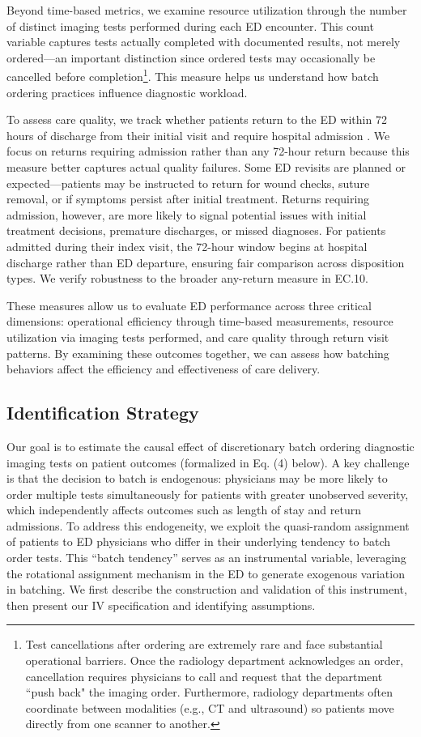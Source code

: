\documentclass[,,blindrev]{informs}
\begin{document}
Beyond time-based metrics, we examine resource utilization through the
number of distinct imaging tests performed during each ED encounter.
This count variable captures tests actually completed with documented
results, not merely ordered---an important distinction since ordered
tests may occasionally be cancelled before
completion\footnote{Test cancellations after ordering are extremely rare and face substantial operational barriers. Once the radiology department acknowledges an order, cancellation requires physicians to call and request that the department ``push back" the imaging order. Furthermore, radiology departments often coordinate between modalities (e.g., CT and ultrasound) so patients move directly from one scanner to another.}.
This measure helps us understand how batch ordering practices influence
diagnostic workload.

To assess care quality, we track whether patients return to the ED
within 72 hours of discharge from their initial visit and require
hospital admission \citep{Lerman1987}. We focus on returns requiring
admission rather than any 72-hour return because this measure better
captures actual quality failures. Some ED revisits are planned or
expected---patients may be instructed to return for wound checks, suture
removal, or if symptoms persist after initial treatment. Returns
requiring admission, however, are more likely to signal potential issues
with initial treatment decisions, premature discharges, or missed
diagnoses. For patients admitted during their index visit, the 72-hour
window begins at hospital discharge rather than ED departure, ensuring
fair comparison across disposition types. We verify robustness to the
broader any-return measure in EC.10.

These measures allow us to evaluate ED performance across three critical
dimensions: operational efficiency through time-based measurements,
resource utilization via imaging tests performed, and care quality
through return visit patterns. By examining these outcomes together, we
can assess how batching behaviors affect the efficiency and
effectiveness of care delivery.

\subsection{Identification Strategy}\label{sec:identification}

Our goal is to estimate the causal effect of discretionary batch
ordering diagnostic imaging tests on patient outcomes (formalized in Eq.
(4) below). A key challenge is that the decision to batch is endogenous:
physicians may be more likely to order multiple tests simultaneously for
patients with greater unobserved severity, which independently affects
outcomes such as length of stay and return admissions. To address this
endogeneity, we exploit the quasi-random assignment of patients to ED
physicians who differ in their underlying tendency to batch order tests.
This ``batch tendency'' serves as an instrumental variable, leveraging
the rotational assignment mechanism in the ED to generate exogenous
variation in batching. We first describe the construction and validation
of this instrument, then present our IV specification and identifying
assumptions.
\end{document}
